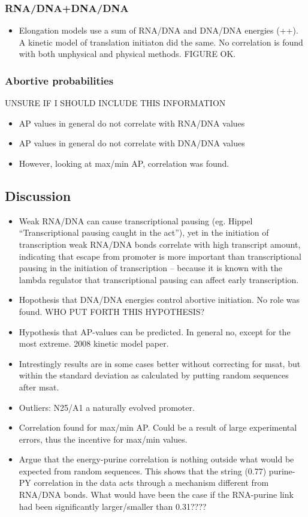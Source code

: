 \documentclass[a4paper]{article}
\begin{document}
\subsubsection{RNA/DNA+DNA/DNA}
\begin{itemize}
	\item Elongation models use a sum of RNA/DNA and DNA/DNA energies (++). A
		kinetic model of translation initiaton did the same. No correlation is
		found with both unphysical and physical methods. FIGURE OK.
\end{itemize}
\subsubsection{Abortive probabilities}
UNSURE IF I SHOULD INCLUDE THIS INFORMATION
\begin{itemize}
	\item AP values in general do not correlate with RNA/DNA values
	\item AP values in general do not correlate with DNA/DNA values
	\item However, looking at max/min AP, correlation was found.
\end{itemize}

\subsection{Discussion}
\begin{itemize}
	\item Weak RNA/DNA can cause transcriptional pausing (eg. Hippel
		``Transcriptional pausing caught in the act''), yet in the initiation of
		transcription weak RNA/DNA bonds correlate with high transcript amount,
		indicating that escape from promoter is more important than
		transcriptional pausing in the initiation of transcription -- because it
		is known with the lambda regulator that transcriptional pausing can
		affect early transcription.
	\item Hopothesis that DNA/DNA energies control abortive initiation. No role
		was found. WHO PUT FORTH THIS HYPOTHESIS?
	\item Hypothesis that AP-values can be predicted. In general no, except for
		the most extreme. 2008 kinetic model paper.
	\item Intrestingly results are in some cases better without correcting for
		msat, but within the standard deviation as calculated by putting random
		sequences after msat.
	\item Outliers: N25/A1 a naturally evolved promoter.
	\item Correlation found for max/min AP. Could be a result of large
		experimental errors, thus the incentive for max/min values. 
	\item  Argue that the energy-purine correlation is nothing outside what
		would be expected from random sequences. This shows that the string
		(0.77) purine-PY correlation in the data acts through a mechanism
		different from RNA/DNA bonds. What would have been the case if the
		RNA-purine link had been significantly larger/smaller than 0.31????
\end{itemize}
\end{document}
